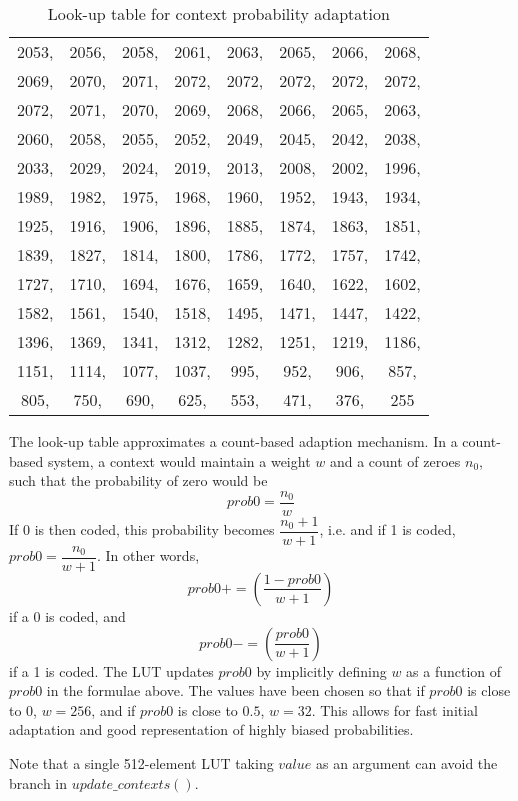 \begin{table}[!ht]
\begin{tabular}{|cccccccc|}
          2053,& 2056,& 2058,& 2061,& 2063,& 2065,& 2066,& 2068,\\
          2069,& 2070,& 2071,& 2072,& 2072,& 2072,& 2072,& 2072,\\
          2072,& 2071,& 2070,& 2069,& 2068,& 2066,& 2065,& 2063,\\
          2060,& 2058,& 2055,& 2052,& 2049,& 2045,& 2042,& 2038,\\
          2033,& 2029,& 2024,& 2019,& 2013,& 2008,& 2002,& 1996,\\
          1989,& 1982,& 1975,& 1968,& 1960,& 1952,& 1943,& 1934,\\
          1925,& 1916,& 1906,& 1896,& 1885,& 1874,& 1863,& 1851,\\
          1839,& 1827,& 1814,& 1800,& 1786,& 1772,& 1757,& 1742,\\
          1727,& 1710,& 1694,& 1676,& 1659,& 1640,& 1622,& 1602,\\
          1582,& 1561,& 1540,& 1518,& 1495,& 1471,& 1447,& 1422,\\
          1396,& 1369,& 1341,& 1312,& 1282,& 1251,& 1219,& 1186,\\
          1151,& 1114,& 1077,& 1037,&  995,&  952,&  906,&  857,\\
           805,&  750,&  690,&  625,&  553,&  471,&  376,&  255\\
\hline
\end{tabular}
\caption{Look-up table for context probability adaptation}
\label{table:lut}
\end{table}

\begin{informative}
The look-up table approximates a count-based adaption mechanism. In
a count-based system, a context would maintain a weight $w$ and a
count of zeroes $n_0$, such that the probability of zero would
be
\[prob0=\dfrac{n_0}{w}\]
If 0 is then coded, this probability becomes $\dfrac{n_0+1}{w+1}$,
i.e. and if 1 is coded, $prob0=\dfrac{n_0}{w+1}$. In other words,
\[prob0+=\left(\dfrac{1-prob0}{w+1}\right)\]
if a 0 is coded, and 
\[prob0-=\left(\dfrac{prob0}{w+1}\right)\]
if a 1 is coded.
The LUT updates $prob0$ by implicitly defining $w$ as a function of
$prob0$ in the formulae above. The values have been chosen so that if $prob0$ is close
to 0, $w=256$, and if $prob0$ is close to $0.5$, $w=32$. This allows
for fast initial adaptation and good representation of highly biased
probabilities. 

Note that a single 512-element LUT taking $value$ as an argument can
avoid the branch in $update\_contexts()$.
\end{informative}

